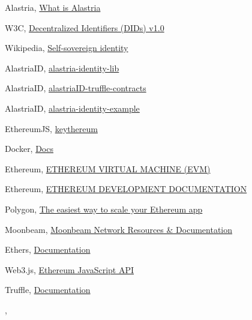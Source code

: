 \documentclass[target=mst,aauheader=]{thud}
\begin{document}
\begin{thebibliography}{99}
    Alastria, \href{https://alastria.io/en/what-is-alastria/}{What is Alastria}


    W3C, \href{https://w3c.github.io/did-core/}{Decentralized Identifiers (DIDs) v1.0}

    Wikipedia, \href{https://en.wikipedia.org/wiki/Self-sovereign_identity}{Self-sovereign identity}

    AlastriaID, \href{https://github.com/alastria/alastria-identity-lib}{alastria-identity-lib}

    AlastriaID, \href{https://github.com/alastria/alastriaID-truffle-contracts}{alastriaID-truffle-contracts}

    AlastriaID, \href{https://github.com/alastria/alastria-identity-example}{alastria-identity-example}

    EthereumJS, \href{https://github.com/ethereumjs/keythereum}{keythereum}


    Docker, \href{https://docs.docker.com/}{Docs}

    Ethereum, \href{https://ethereum.org/en/developers/docs/evm/}{ETHEREUM VIRTUAL MACHINE (EVM)}

    Ethereum, \href{https://ethereum.org/en/developers/docs/}{ETHEREUM DEVELOPMENT DOCUMENTATION}

    Polygon, \href{https://polygon.technology/solutions/polygon-pos}{The easiest way to scale your Ethereum app}

    Moonbeam, \href{https://docs.moonbeam.network/}{Moonbeam Network Resources \& Documentation}

    Ethers, \href{https://docs.ethers.org/v5/}{Documentation}

    Web3.js, \href{https://web3js.readthedocs.io/en/v1.8.2/#web3-js-ethereum-javascript-api}{Ethereum JavaScript API}

    Truffle, \href{https://trufflesuite.com/docs/}{Documentation}

    \bibitem{}
    , \href{}{}

\end{thebibliography}

\end{document}
